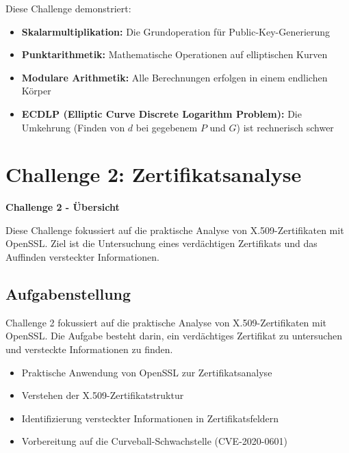 \documentclass{article}
\begin{document}
\begin{tcolorbox}[colback=thd-blue!10,colframe=thd-blue,title=\textbf{Kryptographische Erkenntnisse}]
Diese Challenge demonstriert:
\begin{itemize}[leftmargin=1.5cm]
    \item \textbf{Skalarmultiplikation:} Die Grundoperation für Public-Key-Generierung
    \item \textbf{Punktarithmetik:} Mathematische Operationen auf elliptischen Kurven
    \item \textbf{Modulare Arithmetik:} Alle Berechnungen erfolgen in einem endlichen Körper
    \item \textbf{ECDLP (Elliptic Curve Discrete Logarithm Problem):} Die Umkehrung (Finden von $d$ bei gegebenem $P$ und $G$) ist rechnerisch schwer
\end{itemize}
\end{tcolorbox}

\clearpage



\section{Challenge 2: Zertifikatsanalyse}

\begin{solutionbox}
\textbf{Challenge 2 - Übersicht}

Diese Challenge fokussiert auf die praktische Analyse von X.509-Zertifikaten mit OpenSSL. Ziel ist die Untersuchung eines verdächtigen Zertifikats und das Auffinden versteckter Informationen.
\end{solutionbox}

\subsection{Aufgabenstellung}
Challenge 2 fokussiert auf die praktische Analyse von X.509-Zertifikaten mit OpenSSL. Die Aufgabe besteht darin, ein verdächtiges Zertifikat zu untersuchen und versteckte Informationen zu finden.

\begin{tcolorbox}[colback=thd-blue!10,colframe=thd-blue,title=\textbf{Ziele der Challenge}]
\begin{itemize}[leftmargin=1.5cm]
    \item Praktische Anwendung von OpenSSL zur Zertifikatsanalyse
    \item Verstehen der X.509-Zertifikatstruktur
    \item Identifizierung versteckter Informationen in Zertifikatsfeldern
    \item Vorbereitung auf die Curveball-Schwachstelle (CVE-2020-0601)
\end{itemize}
\end{tcolorbox}
\end{document}
